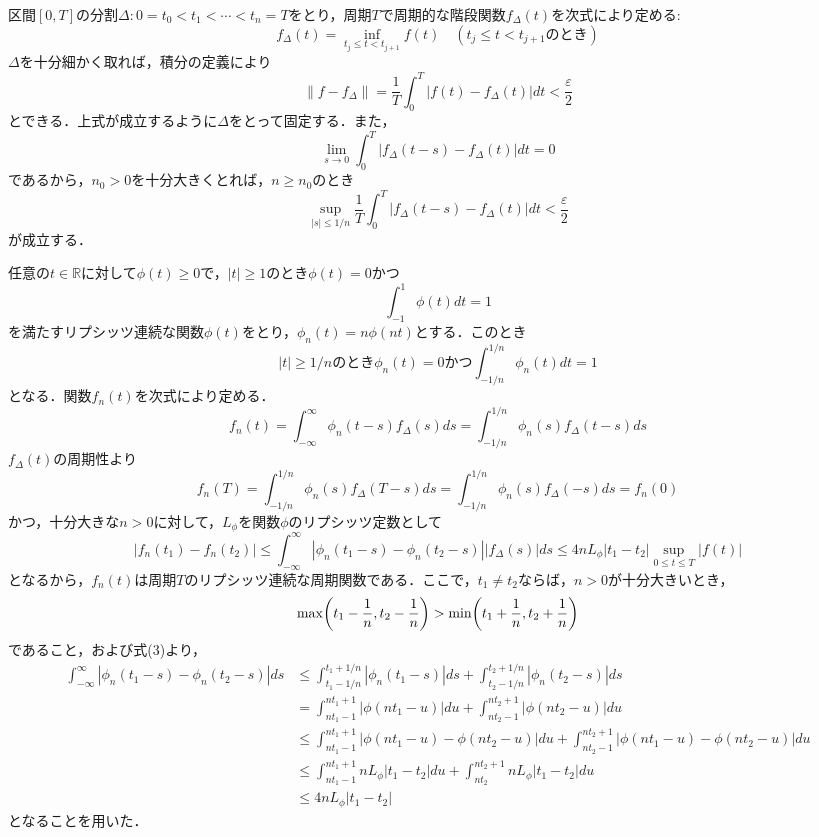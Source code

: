 \documentclass[dvipdfmx,a4j,10pt]{jsarticle}
\makeatletter
\theoremstyle{mystyle1}
\theoremstyle{mystyle3}
\theoremstyle{mystyle4}
\theoremstyle{mystyle2}
\renewenvironment{proof}[1][\proofname]{\par
  \pushQED{\qed}%
  \normalfont
  \topsep6\p@\@plus6\p@ \trivlist
  \item[\hskip\labelsep{\bfseries\sffamily #1}]\ignorespaces
}{%
  \popQED\endtrivlist\@endpefalse
}
\renewcommand\proofname{証明}
\makeatother
\begin{document}

\begin{proof}
    区間$[0,T]$の分割$\Delta:0=t_0<t_1<\cdots<t_n=T$をとり，周期$T$で周期的な階段関数$f_\Delta (t)$を次式により定める:
    \[
        f_\Delta (t)=\inf_{t_j\leq t<t_{j+1}} f(t)\quad(t_j\leq t<t_{j+1}のとき)
    \]
    $\Delta$を十分細かく取れば，積分の定義により
    \begin{equation}
        \|f-f_\Delta\|=\frac{1}{T}\int_0^T|f(t)-f_\Delta(t)|dt<\frac{\varepsilon}{2} \tag{1}
    \end{equation}
    とできる．上式が成立するように$\Delta$をとって固定する．また，
    \[
        \lim_{s\to 0}\int_0^T|f_\Delta(t-s)-f_\Delta(t)|dt=0
    \]
    であるから，$n_0>0$を十分大きくとれば，$n\geq n_0$のとき
    \begin{equation}
        \sup_{|s|\leq 1/n}\frac{1}{T}\int_0^T|f_\Delta(t-s)-f_\Delta(t)|dt<\frac{\varepsilon}{2} \tag{2}
    \end{equation}
    が成立する．

    任意の$t\in\mathbb{R}$に対して$\phi(t)\geq 0$で，$|t|\geq 1$のとき$\phi(t)=0$かつ
    \[
        \int_{-1}^1 \phi(t)dt=1
    \]
    を満たすリプシッツ連続な関数$\phi(t)$をとり，$\phi_n(t)=n\phi(nt)$とする．このとき
    \begin{equation}
        |t|\geq 1/nのとき\phi_n(t)=0かつ\int_{-1/n}^{1/n}\phi_n(t)dt=1 \tag{3}
    \end{equation}
    となる．関数$f_n(t)$を次式により定める．
    \[
        f_n(t)=\int_{-\infty}^\infty \phi_n(t-s)f_\Delta(s)ds=\int_{-1/n}^{1/n}\phi_n(s)f_\Delta(t-s)ds
    \]
    $f_\Delta (t)$の周期性より
    \[
        f_n(T)=\int_{-1/n}^{1/n}\phi_n(s)f_\Delta(T-s)ds=\int_{-1/n}^{1/n}\phi_n(s)f_\Delta(-s)ds=f_n(0)
    \]
    かつ，十分大きな$n>0$に対して，$L_\phi$を関数$\phi$のリプシッツ定数として
    \[
        |f_n(t_1)-f_n(t_2)|\leq\int_{-\infty}^\infty|\phi_n(t_1-s)-\phi_n(t_2-s)||f_\Delta(s)|ds\leq 4nL_\phi|t_1-t_2|\sup_{0\leq t\leq T}|f(t)|
    \]
    となるから，$f_n(t)$は周期$T$のリプシッツ連続な周期関数である．ここで，$t_1\neq t_2$ならば，$n>0$が十分大きいとき，
    \[
        \max\mleft(t_1-\frac{1}{n},t_2-\frac{1}{n}\mright)>\min\mleft(t_1+\frac{1}{n},t_2+\frac{1}{n}\mright)
    \]
    であること，および式(3)より，
    \[
        \begin{split}
            \int_{-\infty}^\infty|\phi_n(t_1-s)-\phi_n(t_2-s)|ds
            &\leq \int_{t_1-1/n}^{t_1+1/n}|\phi_n(t_1-s)|ds+\int_{t_2-1/n}^{t_2+1/n}|\phi_n(t_2-s)|ds \\
            & =\int_{nt_1-1}^{nt_1+1}|\phi(nt_1-u)|du+\int_{nt_2-1}^{nt_2+1}|\phi(nt_2-u)|du \\
            &\leq \int_{nt_1-1}^{nt_1+1}|\phi(nt_1-u)-\phi(nt_2-u)|du+\int_{nt_2-1}^{nt_2+1}|\phi(nt_1-u)-\phi(nt_2-u)|du \\
            &\leq \int_{nt_1-1}^{nt_1+1} nL_\phi|t_1-t_2|du +\int_{nt_2}^{nt_2+1}nL_\phi|t_1-t_2|du \\
            &\leq 4nL_\phi|t_1-t_2|
        \end{split}
    \]
    となることを用いた．


\end{proof}
\end{document}
